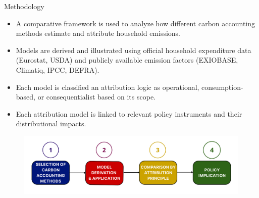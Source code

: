 \documentclass{beamer}
\begin{document}
\begin{frame}{Methodology}
\footnotesize
\vspace{-2.5em}
\begin{itemize}
\item A comparative framework is used to analyze how different carbon accounting methods estimate and attribute household emissions.
\pause
\item Models are derived and illustrated using official household expenditure data (Eurostat, USDA) and publicly available emission factors (EXIOBASE, Climatiq, IPCC, DEFRA).
\pause
\item Each model is classified an attribution logic as operational, consumption-based, or consequentialist based on its scope.
\pause
\item Each attribution model is linked to relevant policy instruments and their distributional impacts.
\end{itemize}
\pause
\begin{figure}
\centering
\includegraphics[width=\linewidth]{Methodology chart.png}
\end{figure}
\end{frame}

\end{document}
